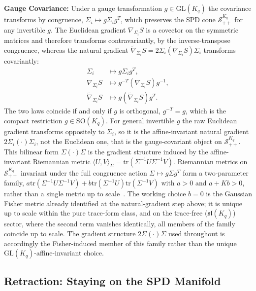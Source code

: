 \documentclass[11pt]{article}
\begin{document}
\textbf{Gauge Covariance:} Under a gauge transformation $g \in \mathrm{GL}(K_q)$ the covariance transforms by congruence, $\Sigma_i \mapsto g\Sigma_i g^T$, which preserves the SPD cone $\mathcal{S}_{++}^{K_q}$ for any invertible $g$. The Euclidean gradient $\nabla_{\Sigma_i} S$ is a covector on the symmetric matrices and therefore transforms contravariantly, by the inverse-transpose congruence, whereas the natural gradient $\tilde{\nabla}_{\Sigma_i} S = 2\Sigma_i(\nabla_{\Sigma_i} S)\Sigma_i$ transforms covariantly:
\begin{align}
\Sigma_i &\mapsto g\Sigma_i g^T, \\
\nabla_{\Sigma_i} S &\mapsto g^{-T}(\nabla_{\Sigma_i} S)g^{-1}, \\
\tilde{\nabla}_{\Sigma_i} S &\mapsto g(\tilde{\nabla}_{\Sigma_i} S)g^T.
\end{align}
The two laws coincide if and only if $g$ is orthogonal, $g^{-T} = g$, which is the compact restriction $g \in \mathrm{SO}(K_q)$. For general invertible $g$ the raw Euclidean gradient transforms oppositely to $\Sigma_i$, so it is the affine-invariant natural gradient $2\Sigma_i(\cdot)\Sigma_i$, not the Euclidean one, that is the gauge-covariant object on $\mathcal{S}_{++}^{K_q}$. This bilinear form $\Sigma(\cdot)\Sigma$ is the gradient structure induced by the affine-invariant Riemannian metric $\langle U, V\rangle_\Sigma = \mathrm{tr}(\Sigma^{-1}U\Sigma^{-1}V)$. Riemannian metrics on $\mathcal{S}_{++}^{K_q}$ invariant under the full congruence action $\Sigma \mapsto g\Sigma g^T$ form a two-parameter family, $a \mathrm{tr}(\Sigma^{-1}U\Sigma^{-1}V) + b \mathrm{tr}(\Sigma^{-1}U)\mathrm{tr}(\Sigma^{-1}V)$ with $a > 0$ and $a + Kb > 0$, rather than a single metric up to scale~\cite{Pennec2006, Amari2016, Bhatia2007}. The working choice $b = 0$ is the Gaussian Fisher metric already identified at the natural-gradient step above; it is unique up to scale within the pure trace-form class, and on the trace-free ($\mathfrak{sl}(K_q)$) sector, where the second term vanishes identically, all members of the family coincide up to scale. The gradient structure $2\Sigma(\cdot)\Sigma$ used throughout is accordingly the Fisher-induced member of this family rather than the unique $\mathrm{GL}(K_q)$-affine-invariant choice.

\subsection*{Retraction: Staying on the SPD Manifold}
\end{document}
